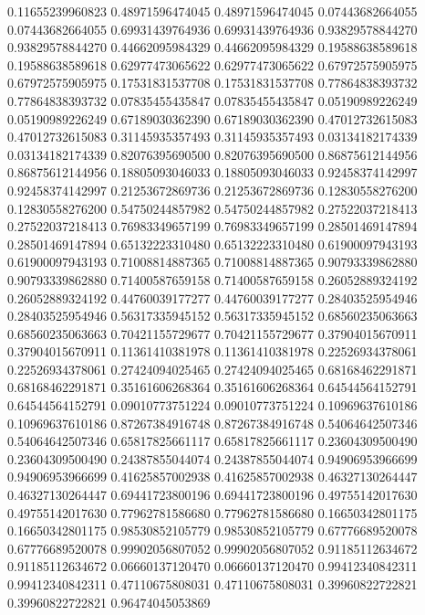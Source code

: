    0.11655239960823   0.48971596474045
   0.48971596474045   0.07443682664055
   0.07443682664055   0.69931439764936
   0.69931439764936   0.93829578844270
   0.93829578844270   0.44662095984329
   0.44662095984329   0.19588638589618
   0.19588638589618   0.62977473065622
   0.62977473065622   0.67972575905975
   0.67972575905975   0.17531831537708
   0.17531831537708   0.77864838393732
   0.77864838393732   0.07835455435847
   0.07835455435847   0.05190989226249
   0.05190989226249   0.67189030362390
   0.67189030362390   0.47012732615083
   0.47012732615083   0.31145935357493
   0.31145935357493   0.03134182174339
   0.03134182174339   0.82076395690500
   0.82076395690500   0.86875612144956
   0.86875612144956   0.18805093046033
   0.18805093046033   0.92458374142997
   0.92458374142997   0.21253672869736
   0.21253672869736   0.12830558276200
   0.12830558276200   0.54750244857982
   0.54750244857982   0.27522037218413
   0.27522037218413   0.76983349657199
   0.76983349657199   0.28501469147894
   0.28501469147894   0.65132223310480
   0.65132223310480   0.61900097943193
   0.61900097943193   0.71008814887365
   0.71008814887365   0.90793339862880
   0.90793339862880   0.71400587659158
   0.71400587659158   0.26052889324192
   0.26052889324192   0.44760039177277
   0.44760039177277   0.28403525954946
   0.28403525954946   0.56317335945152
   0.56317335945152   0.68560235063663
   0.68560235063663   0.70421155729677
   0.70421155729677   0.37904015670911
   0.37904015670911   0.11361410381978
   0.11361410381978   0.22526934378061
   0.22526934378061   0.27424094025465
   0.27424094025465   0.68168462291871
   0.68168462291871   0.35161606268364
   0.35161606268364   0.64544564152791
   0.64544564152791   0.09010773751224
   0.09010773751224   0.10969637610186
   0.10969637610186   0.87267384916748
   0.87267384916748   0.54064642507346
   0.54064642507346   0.65817825661117
   0.65817825661117   0.23604309500490
   0.23604309500490   0.24387855044074
   0.24387855044074   0.94906953966699
   0.94906953966699   0.41625857002938
   0.41625857002938   0.46327130264447
   0.46327130264447   0.69441723800196
   0.69441723800196   0.49755142017630
   0.49755142017630   0.77962781586680
   0.77962781586680   0.16650342801175
   0.16650342801175   0.98530852105779
   0.98530852105779   0.67776689520078
   0.67776689520078   0.99902056807052
   0.99902056807052   0.91185112634672
   0.91185112634672   0.06660137120470
   0.06660137120470   0.99412340842311
   0.99412340842311   0.47110675808031
   0.47110675808031   0.39960822722821
   0.39960822722821   0.96474045053869
